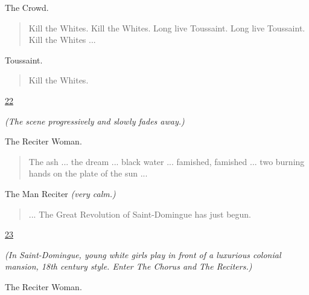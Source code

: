 \documentclass[letterpaper,article,12pt,oneside,notitlepage]{memoir}
\begin{document}
\begin{center}The Crowd.\end{center}

\begin{verse}
\indent Kill the Whites. Kill the Whites. Long live Toussaint. Long live Toussaint. Kill the Whites ... \\
\end{verse}

\begin{center}Toussaint.\end{center}

\begin{verse}
\hspace{1cm} Kill the Whites. \\
\end{verse}

\clearpage

\href{http://cesaire.elotroalex.com/chiens/chiens/p022.html}{22}

\textit{(The scene progressively and slowly fades away.)}

\begin{center}The Reciter Woman.\end{center}

\begin{verse}
\indent The ash ... the dream ... black water ... famished, famished ... two burning hands on the plate of the sun ... \\
\end{verse}

\begin{center}The Man Reciter \textit{(very calm.)}\end{center}

\begin{verse}
\hspace{1cm} ... The Great Revolution of Saint-Domingue has just begun. \\
\end{verse}

\clearpage

\href{http://cesaire.elotroalex.com/chiens/chiens/p023.html}{23}

\textit{(In Saint-Domingue, young white girls play in front of a luxurious colonial mansion, 18th century style. Enter The Chorus and The Reciters.)} 

\begin{center}The Reciter Woman.\end{center}
\end{document}
